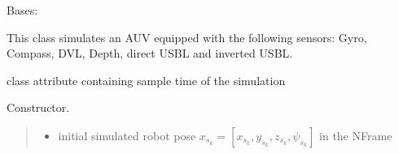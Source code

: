 \documentclass[letterpaper,10pt,english]{sphinxmanual}
\begin{document}
\begin{fulllineitems}
\label{\detokenize{robot_simulation:AUV4DOFSimulatedRobot.AUV4DOFSimulatedRobot}}
\pysigstartsignatures
{}
\pysigstopsignatures
\sphinxAtStartPar
Bases: {\hyperref[\detokenize{robot_simulation:SimulatedRobot.SimulatedRobot}]{}}

\sphinxAtStartPar
This class simulates an AUV equipped with the following sensors: Gyro, Compass, DVL, Depth, direct USBL and  inverted USBL.

\begin{fulllineitems}
\label{\detokenize{robot_simulation:AUV4DOFSimulatedRobot.AUV4DOFSimulatedRobot.dt}}
\pysigstartsignatures
{}
\pysigstopsignatures
\sphinxAtStartPar
class attribute containing sample time of the simulation

\end{fulllineitems}


\begin{fulllineitems}
\label{\detokenize{robot_simulation:AUV4DOFSimulatedRobot.AUV4DOFSimulatedRobot.__init__}}
\pysigstartsignatures
{}
\pysigstopsignatures
\sphinxAtStartPar
Constructor.
\begin{quote}\begin{description}
\begin{itemize}
\item {} 
\sphinxAtStartPar
{} \textendash{} initial simulated robot pose \(x_{s_k}=[x_{s_k},y_{s_k},z_{s_k},\psi_{s_k}]\)  in the N\sphinxhyphen{}Frame


\end{itemize}
\end{description}
\end{quote}
\end{fulllineitems}
\end{fulllineitems}
\end{document}
